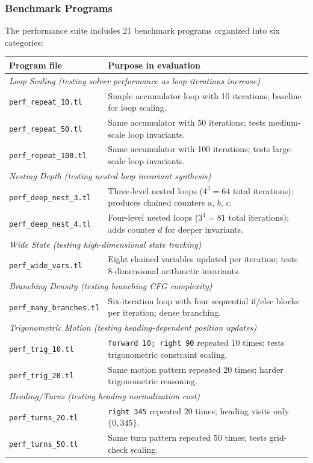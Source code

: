 \subsubsection*{Benchmark Programs}

The performance suite includes 21 benchmark programs organized into six categories:

\begin{longtable}{p{} p{}}
\toprule
\textbf{Program file} & \textbf{Purpose in evaluation} \\
\midrule
\multicolumn{2}{l}{\textit{Loop Scaling (testing solver performance as loop iterations increase)}} \\
\midrule
\texttt{perf\_repeat\_10.tl} & Simple accumulator loop with 10 iterations; baseline for loop scaling. \\
\texttt{perf\_repeat\_50.tl} & Same accumulator with 50 iterations; tests medium-scale loop invariants. \\
\texttt{perf\_repeat\_100.tl} & Same accumulator with 100 iterations; tests large-scale loop invariants. \\
\midrule
\multicolumn{2}{l}{\textit{Nesting Depth (testing nested loop invariant synthesis)}} \\
\midrule
\texttt{perf\_deep\_nest\_3.tl} & Three-level nested loops ($4^3 = 64$ total iterations); produces chained counters $a$, $b$, $c$. \\
\texttt{perf\_deep\_nest\_4.tl} & Four-level nested loops ($3^4 = 81$ total iterations); adds counter $d$ for deeper invariants. \\
\midrule
\multicolumn{2}{l}{\textit{Wide State (testing high-dimensional state tracking)}} \\
\midrule
\texttt{perf\_wide\_vars.tl} & Eight chained variables updated per iteration; tests 8-dimensional arithmetic invariants. \\
\midrule
\multicolumn{2}{l}{\textit{Branching Density (testing branching CFG complexity)}} \\
\midrule
\texttt{perf\_many\_branches.tl} & Six-iteration loop with four sequential if/else blocks per iteration; dense branching. \\
\midrule
\multicolumn{2}{l}{\textit{Trigonometric Motion (testing heading-dependent position updates)}} \\
\midrule
\texttt{perf\_trig\_10.tl} & \texttt{forward 10; right 90} repeated 10 times; tests trigonometric constraint scaling. \\
\texttt{perf\_trig\_20.tl} & Same motion pattern repeated 20 times; harder trigonometric reasoning. \\
\midrule
\multicolumn{2}{l}{\textit{Heading/Turns (testing heading normalization cost)}} \\
\midrule
\texttt{perf\_turns\_20.tl} & \texttt{right 345} repeated 20 times; heading visits only $\{0, 345\}$. \\
\texttt{perf\_turns\_50.tl} & Same turn pattern repeated 50 times; tests grid-check scaling. \\
\bottomrule
\end{longtable}

